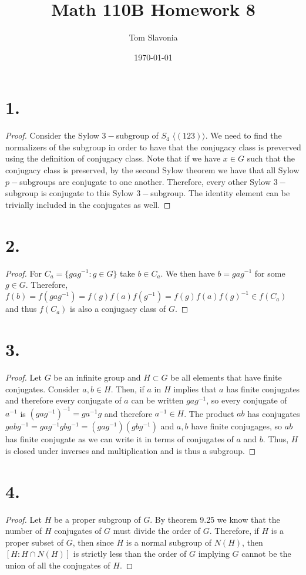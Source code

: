 \documentclass{article}
\title{Math 110B Homework 8}
\author{Tom Slavonia}
\date{\today}
\begin{document}
\maketitle

\section*{1.}
\begin{proof}
    Consider the Sylow $3-$subgroup of $S_4$ $\langle (123) \rangle$. We need to find the normalizers of the subgroup in order to have that the conjugacy class is preverved using the definition of conjugacy class. Note that if we have $x \in G$ such that the conjugacy class is preserved, by the second Sylow theorem we have that all Sylow $p-$subgroups are conjugate to one another. Therefore, every other Sylow $3-$subgroup is conjugate to this Sylow $3-$subgroup. The identity element can be trivially included in the conjugates as well. 
\end{proof}

\section*{2.}
\begin{proof}
    For $C_a = \{gag^{-1}: g \in G\}$ take $b \in C_a$. We then have $b = gag^{-1}$ for some $g \in G$. Therefore, 
    $f(b) = f(gag^{-1}) = f(g)f(a)f(g^{-1}) = f(g)f(a)f(g)^{-1} \in f(C_a)$ and thus $f(C_a)$ is also a conjugacy class of $G$. 
\end{proof}

\section*{3.}
\begin{proof}
    Let $G$ be an infinite group and $H\subset G$ be all elements that have finite conjugates. Consider $a, b \in H$. Then, if $a$ in $H$ implies that $a $ has finite conjugates and therefore every conjugate of $a$ can be written $gag^{-1}$, so every conjugate of $a^{-1}$ is $(gag^{-1})^{-1} = ga^{-1}g$ and therefore $a^{-1} \in H$. The product $ab$ has conjugates $gabg^{-1} = gag^{-1}gbg^{-1} = (gag^{-1})(gbg^{-1})$ and $a, b$ have finite conjugages, so $ab$ has finite conjugate as we can write it in terms of conjugates of $a$ and $b$. Thus, $H$ is closed under inverses and multiplication and is thus a subgroup.  
\end{proof}

\section*{4.}
\begin{proof}
    Let $H$ be a proper subgroup of $G$. By theorem 9.25 we know that the number of $H$ conjugates of $G$ must divide the order of $G$. Therefore, if $H$ is a proper subset of $G$, then since $H$ is a normal subgroup of $N(H)$, then $[H : H \cap N(H)]$ is strictly less than the order of $G$ implying $G$ cannot be the union of all the conjugates of $H$. 
\end{proof}
\end{document}

